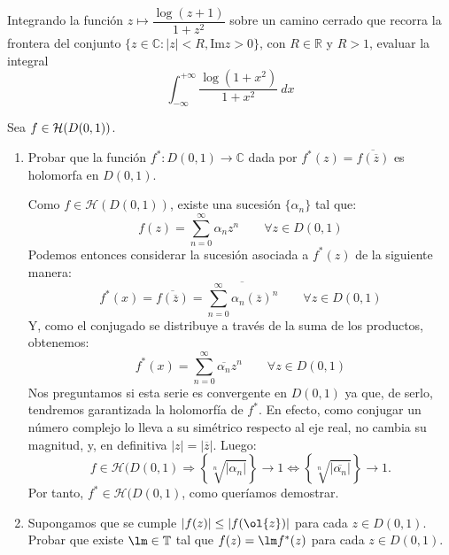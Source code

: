\documentclass[12pt]{article}
\begin{document}
    \begin{ejercicio}[2.5 puntos]
        Integrando la función $z\longmapsto \dfrac{\log(z+1)}{1+z^2}$ sobre un camino cerrado que recorra la frontera del conjunto $\{z\in \mathbb{C} : |z| < R, \text{Im}z > 0\}$, con $R\in \mathbb{R}$ y $R>1$, evaluar la integral
        \begin{equation*}
            \int_{-\infty}^{+\infty} \dfrac{\log(1+x^2)}{1+x^2}~dx 
        \end{equation*}
    \end{ejercicio}

    \begin{ejercicio}[2.5 puntos]
        Sea $f\in \mathcal{H}(D(0,1))$.
        \begin{enumerate}[label=\alph*)]
            \item Probar que la función $f^\ast:D(0,1)\to \mathbb{C}$ dada por $f^\ast(z) = \overline{f(\overline{z})}$ es holomorfa en $D(0,1)$.
            
            Como \(f \in \mathcal{H}(D(0,1))\), existe una sucesión \(\{\alpha_n\}\) tal que:
            \[
                f(z) = \sum_{n=0}^\infty\alpha_n z^n \qquad \forall z \in D(0,1)
            \]
            Podemos entonces considerar la sucesión asociada a \(f^\ast(z)\) de la siguiente manera:
            \[
                f^\ast(x) = \overline{f(\overline{z})} = \overline{\sum_{n=0}^\infty\alpha_n (\overline{z})^n} \qquad \forall z \in D(0,1)
            \]
            Y, como el conjugado se distribuye a través de la suma de los productos, obtenemos:
            \[
                f^\ast(x) = \sum_{n=0}^\infty\overline{\alpha_n}z^n \qquad \forall z \in D(0,1)
            \]
            Nos preguntamos si esta serie es convergente en \(D(0,1)\) ya que, de serlo, tendremos garantizada la holomorfía de \(f^\ast\). En efecto, como conjugar un número complejo lo lleva a su simétrico respecto al eje real, no cambia su magnitud, y, en definitiva \(|z| = |\overline{z}|\).
            Luego:
            \[
                f \in \mathcal{H}(D(0,1) \Longrightarrow\left\{ \sqrt[n]{|\alpha_n|}\right\} \xrightarrow{} 1
                \iff \left\{ \sqrt[n]{\left|\overline{\alpha_n}\right|}\right\} \xrightarrow{} 1. 
            \]
            Por tanto, \(f^\ast \in \mathcal{H}(D(0,1)\), como queríamos demostrar.
            \item Supongamos que se cumple $|f(z)| \leq |f(\ol{z})|$ para cada $z\in D(0,1)$. Probar que existe $\lm\in \bb{T}$ tal que $f(z)=\lm f^\ast(z)$ para cada $z\in D(0,1)$.
            

\end{enumerate}
\end{ejercicio}
\end{document}
